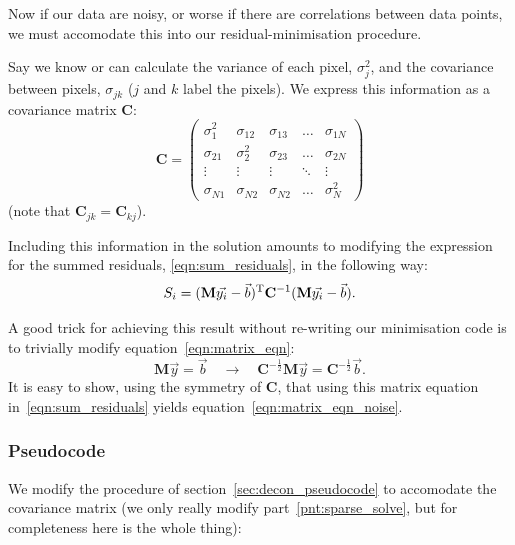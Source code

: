 \documentclass[letterpaper, 11pt]{article}
\begin{document}
Now if our data are noisy, or worse if there are correlations between data points, we must accomodate this into our residual-minimisation procedure.

Say we know or can calculate the variance of each pixel, $\sigma_j^2$, and the covariance between pixels, $\sigma_{jk}$ ($j$ and $k$ label the pixels).  We express this information as a covariance matrix $\mathbf{C}$:
\begin{equation}
	\mathbf{C} =
	\begin{pmatrix}
		\sigma_1^2	& \sigma_{12}	& \sigma_{13}	& \ldots	& \sigma_{1N}\\
		\sigma_{21}	& \sigma_2^2	& \sigma_{23}	& \ldots 	& \sigma_{2N}\\
		\vdots		& \vdots 		&  \vdots		& \ddots & \vdots \\
		\sigma_{N1}	& \sigma_{N2} 	& \sigma_{N2}	& \ldots	& \sigma_N^2
	\end{pmatrix}
\end{equation}
(note that $\mathbf{C}_{jk}=\mathbf{C}_{kj}$).

Including this information in the solution amounts to modifying the expression for the summed residuals, \ref{eqn:sum_residuals}, in the following way:
\begin{equation}\label{eqn:matrix_eqn_noise}
	S_i = (\mathbf M \vec{y_i} - \vec b)^{\rm T}\mathbf{C}^{-1}(\mathbf M \vec{y_i} - \vec b).
\end{equation}

A good trick for achieving this result without re-writing our minimisation code is to trivially modify equation~\ref{eqn:matrix_eqn}:
\begin{equation}
	\mathbf M \vec y = \vec b \quad\longrightarrow\quad \mathbf{C}^{-\frac{1}{2}}\mathbf{M} \vec y = \mathbf{C}^{-\frac{1}{2}}\vec b.
\end{equation}
It is easy to show, using the symmetry of $\mathbf{C}$, that using this matrix equation in~\ref{eqn:sum_residuals} yields equation~\ref{eqn:matrix_eqn_noise}.



\subsubsection{Pseudocode}

We modify the procedure of section~\ref{sec:decon_pseudocode} to accomodate the covariance matrix (we only really modify part~\ref{pnt:sparse_solve}, but for completeness here is the whole thing):
\end{document}
